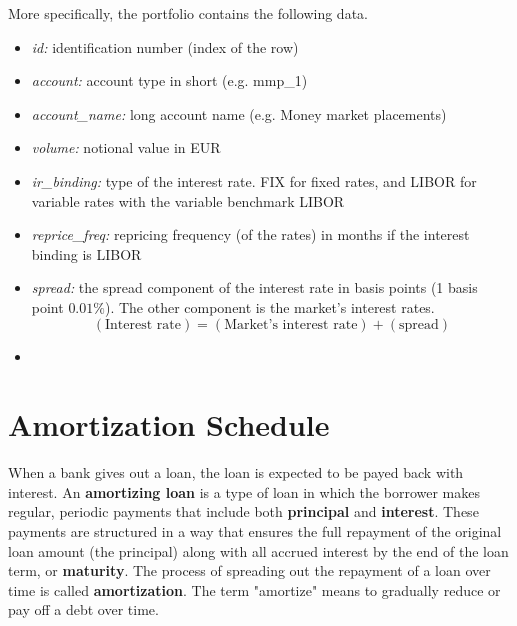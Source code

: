 \documentclass[11pt]{article}
\begin{document}
More specifically, the portfolio contains the following data. 
\begin{itemize}
	\item \textit{id:} identification number (index of the row)
	\item \textit{account:} account type in short (e.g. mmp\_1)
	\item \textit{account\_name:} long account name (e.g. Money market placements)
	\item \textit{volume:} notional value in EUR
	\item \textit{ir\_binding:} type of the interest rate. FIX for fixed rates, and LIBOR for variable rates with the variable benchmark LIBOR
	\item \textit{reprice\_freq:} repricing frequency (of the rates) in months if the interest binding is LIBOR
	\item \textit{spread:} the spread component of the interest rate in basis points (1 basis point $0.01\%$). The other component is the market's interest rates. $$(\text{Interest rate}) = (\text{Market's interest rate})+(\text{spread})$$
	\item 
\end{itemize}

    


\section{Amortization Schedule}

When a bank gives out a loan, the loan is expected to be payed back with interest. An \textbf{amortizing loan} is a type of loan in which the borrower makes regular, periodic payments that include both \textbf{principal} and \textbf{interest}. These payments are structured in a way that ensures the full repayment of the original loan amount (the principal) along with all accrued interest by the end of the loan term, or \textbf{maturity}. The process of spreading out the repayment of a loan over time is called \textbf{amortization}. The term "amortize" means to gradually reduce or pay off a debt over time.\\
\end{document}
